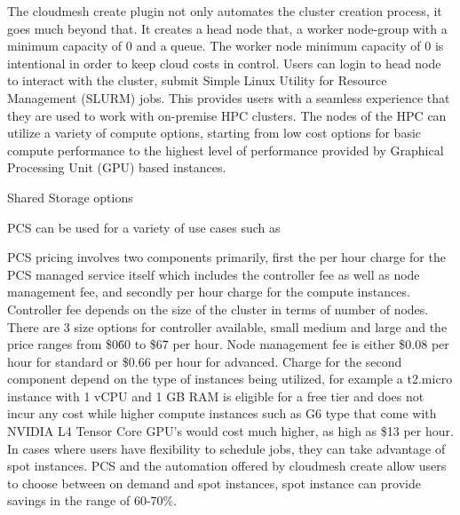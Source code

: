 \documentclass[utf8]{FrontiersinVancouver} %
\begin{document}
The cloudmesh create plugin not only automates the cluster creation process, it goes much beyond that. It creates a head node that, a worker node-group with a minimum capacity of 0 and a  queue. The worker node minimum capacity of 0 is intentional in order to keep cloud costs in control. Users can login to head node to interact with the cluster, submit Simple Linux Utility for Resource Management (SLURM) jobs. This provides users with a seamless experience that they are used to work with on-premise HPC clusters. The nodes of the HPC can utilize a variety of compute options, starting from low cost options for basic compute performance to the highest level of performance provided by Graphical Processing Unit (GPU) based instances.

Shared Storage options

PCS can be used for a variety of use cases such as   

PCS pricing involves two components primarily, first the per hour charge for the PCS managed service itself which includes the controller fee as well as node management fee, and secondly per hour charge for the compute instances. Controller fee depends on the size of the cluster in terms of number of nodes. There are 3 size options for controller available, small medium and large and the price ranges from \$0\.60 to \$6\.7 per hour. Node management fee is either \$0.08 per hour for standard or \$0.66 per hour for advanced. \citep{HPCpricing} Charge for the second component depend on the type of instances being utilized, for example a t2.micro instance with 1 vCPU and 1 GB RAM is eligible for a free tier and does not incur any cost while higher compute instances such as G6 type that come with NVIDIA L4 Tensor Core GPU's would cost much higher, as high as \$13 per hour. \citep{ec2ondemand} In cases where users have flexibility to schedule jobs, they can take advantage of spot instances. PCS and the automation offered by cloudmesh create allow users to choose between on demand and spot instances, spot instance can provide savings in the range of 60-70\%. \citep{spotSavings:online}






% 



\end{document}
